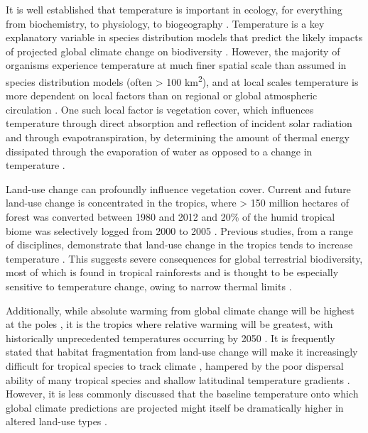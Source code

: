 \documentclass[12pt,a4paper,]{report}
\theoremstyle{definition}
\theoremstyle{definition}
\theoremstyle{definition}
\theoremstyle{remark}
\begin{document}
It is well established that temperature is important in ecology, for
everything from biochemistry, to physiology, to biogeography
\citep{thomas_extinction2004, kearney_potential2009, kingsolver_welltemperatured2009, puurtinen_temperature-dependent2015}.
Temperature is a key explanatory variable in species distribution models
that predict the likely impacts of projected global climate change on
biodiversity \citep[e.g.][]{thomas_extinction2004}. However, the
majority of organisms experience temperature at much finer spatial scale
\citep{gillingham_relative2010, suggitt_habitat2011} than assumed in
species distribution models (often \textgreater{} 100
km\textsuperscript{2}), and at local scales temperature is more
dependent on local factors \citep{suggitt_habitat2011} than on regional
or global atmospheric circulation
\citep{oke_boundary1987, davin_climatic2010, wiens_matching2010, pielke_land2011}.
One such local factor is vegetation cover, which influences temperature
through direct absorption and reflection of incident solar radiation
\citep{oke_boundary1987, murcia_edge1995, snyder_analyzing2004} and
through evapotranspiration, by determining the amount of thermal energy
dissipated through the evaporation of water as opposed to a change in
temperature
\citep{oke_boundary1987, findell_modeled2007, lawrence_effects2015}.

Land-use change can profoundly influence vegetation cover. Current and
future land-use change is concentrated in the tropics, where
\textgreater{} 150 million hectares of forest was converted between 1980
and 2012 \citep{gibbs_tropical2010, hansen_high-resolution2013} and 20\%
of the humid tropical biome was selectively logged from 2000 to 2005
\citep{asner_contemporary2009}. Previous studies, from a range of
disciplines, demonstrate that land-use change in the tropics tends to
increase temperature
\citep{findell_modeled2007, loarie_velocity2009, davin_climatic2010, luskin_microclimate2011, pielke_land2011, ramdani_local2014, lawrence_effects2015}.
This suggests severe consequences for global terrestrial biodiversity,
most of which is found in tropical rainforests
\citep{myers_biodiversity2000} and is thought to be especially sensitive
to temperature change, owing to narrow thermal limits
\citep{deutsch_impacts2008, tewksbury_putting2008, kingsolver_welltemperatured2009}.

Additionally, while absolute warming from global climate change will be
highest at the poles \citep{ipcc2013}, it is the tropics where relative
warming will be greatest, with historically unprecedented temperatures
occurring by 2050 \citep{mora_projected2013}. It is frequently stated
that habitat fragmentation from land-use change will make it
increasingly difficult for tropical species to track climate
\citep{brook_synergies2008, scriven_protected2015}, hampered by the poor
dispersal ability of many tropical species
\citep{van_houtan_dispersal2007} and shallow latitudinal temperature
gradients \citep{colwell_global2008}. However, it is less commonly
discussed that the baseline temperature onto which global climate
predictions are projected might itself be dramatically higher in altered
land-use types \citep{foster_establishing2011, tuff_framework2016}.
\end{document}
